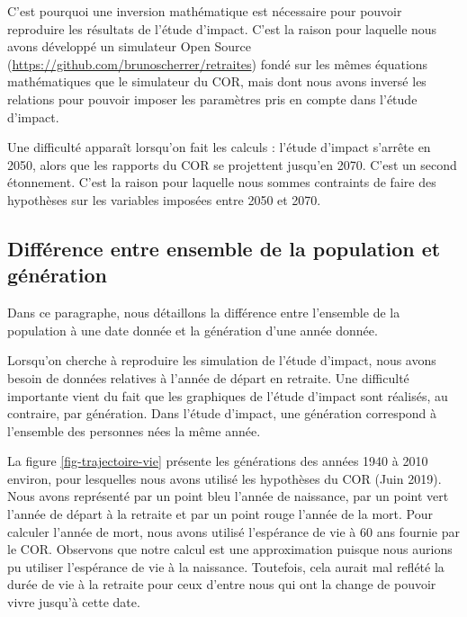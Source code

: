 \documentclass[10pt]{article}
\begin{document}
C'est pourquoi une inversion mathématique est nécessaire pour pouvoir reproduire 
les résultats de l'étude d'impact. 
C'est la raison pour laquelle nous avons développé un simulateur Open Source 
(\url{https://github.com/brunoscherrer/retraites}) fondé sur les mêmes équations mathématiques 
que le simulateur du COR, mais dont nous avons inversé les relations pour 
pouvoir imposer les paramètres pris en compte dans l'étude d'impact. 

Une difficulté apparaît lorsqu'on fait les calculs : 
l'étude d'impact s'arrête en 2050, alors que les rapports du COR 
se projettent jusqu'en 2070. 
C'est un second étonnement. 
C'est la raison pour laquelle nous sommes contraints de faire des 
hypothèses sur les variables imposées entre 2050 et 2070. 


\subsection{Différence entre ensemble de la population et génération}

Dans ce paragraphe, nous détaillons la différence entre 
l'ensemble de la population à une date donnée et la génération d'une année 
donnée. 

Lorsqu'on cherche à reproduire les simulation de l'étude d'impact, nous 
avons besoin de données relatives à l'année de départ en retraite. 
Une difficulté importante vient du fait que les graphiques de l'étude 
d'impact sont réalisés, au contraire, par génération. 
Dans l'étude d'impact, une génération correspond à l'ensemble des personnes 
nées la même année. 

La figure \ref{fig-trajectoire-vie} présente les générations des années 1940 
à 2010 environ, pour lesquelles nous avons utilisé les hypothèses du COR (Juin 2019).
Nous avons représenté par un point bleu l'année de naissance, par un point 
vert l'année de départ à la retraite et par un point rouge l'année de la 
mort. 
Pour calculer l'année de mort, nous avons utilisé l'espérance de vie à 60 ans 
fournie par le COR. 
Observons que notre calcul est une approximation puisque nous aurions pu utiliser 
l'espérance de vie à la naissance. 
Toutefois, cela aurait mal reflété la durée de vie à la retraite pour ceux 
d'entre nous qui ont la change de pouvoir vivre jusqu'à cette date. 
\end{document}
